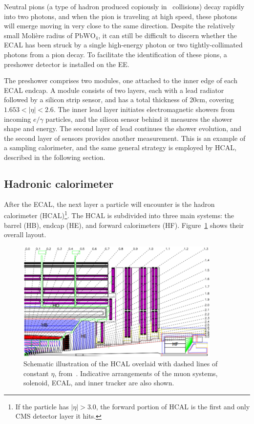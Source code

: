 \documentclass[oneside, letterpaper, 12pt, oldfontcommands]{memoir}
\begin{document}
Neutral pions (a type of hadron produced copiously in \Pp\Pp\ collisions) decay rapidly into two photons,
and when the pion is traveling at high speed, these photons will emerge moving in very close to the same direction.
Despite the relatively small Molière radius of $\mathrm{PbWO}_{4}$, it can still be difficult to discern whether the ECAL
has been struck by a single high-energy photon or two tightly-collimated photons from a pion decay.
To facilitate the identification of these pions, a preshower detector is installed on the EE.

The preshower comprises two modules, one attached to the inner edge of each ECAL endcap. A module consists of two layers,
each with a lead radiator followed by a silicon strip sensor, and has a total thickness of 20\unit{cm}, covering $1.653 < |\eta| < 2.6$.
The inner lead layer initiates electromagnetic showers from incoming $e/\gamma$ particles,
and the silicon sensor behind it measures the shower shape and energy.
The second layer of lead continues the shower evolution, and the second layer of sensors provides another measurement.
This is an example of a sampling calorimeter, and the same general strategy is employed by HCAL, described in the following section.

\subsection{Hadronic calorimeter} \label{sec:LHCCMS_CMS_HCAL}
After the ECAL, the next layer a particle will encounter is the hadron calorimeter (HCAL)\footnote{If the particle has $|\eta| > 3.0$,
the forward portion of HCAL is the first and only CMS detector layer it hits.}.
The HCAL is subdivided into three main systems: the barrel (HB), endcap (HE), and forward calorimeters (HF).
Figure~\ref{fig:hcal_schematic} shows their overall layout.

\begin{figure}[hbtp]
  \begin{center}
    \includegraphics[width=0.90\textwidth]{Figures/hcal_layout.png}
    \caption{
    Schematic illustration of the HCAL overlaid with dashed lines of constant $\eta$, from~\cite{ref:1748-0221/3/08/S08004}.
    Indicative arrangements of the muon systems, solenoid, ECAL, and inner tracker are also shown.
    }
    \label{fig:hcal_schematic}
  \end{center}
\end{figure}
\end{document}
